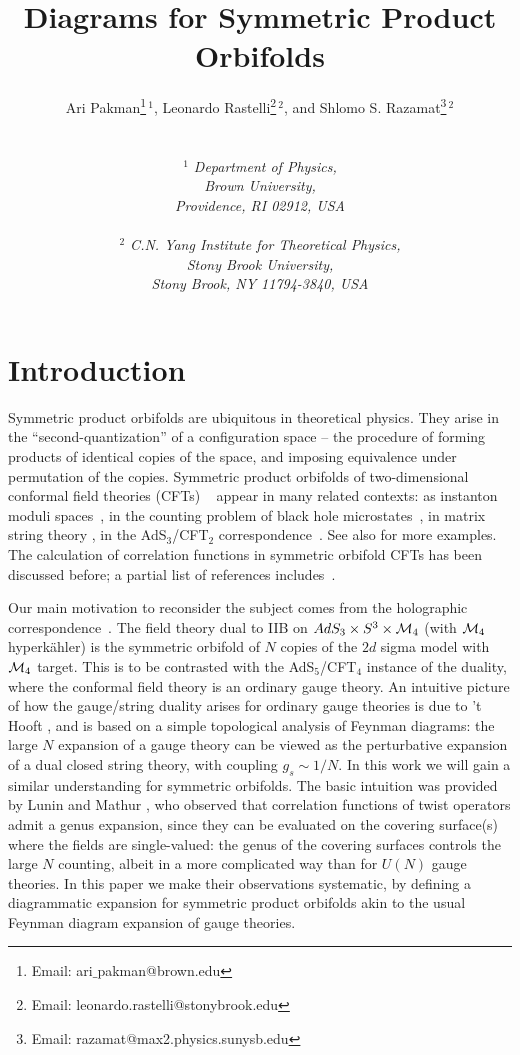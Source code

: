 \documentclass[letterpaper]{JHEP3}
\title{Diagrams for Symmetric Product Orbifolds}
\author{
Ari Pakman\footnote{Email: ari$\_$pakman@brown.edu}$^{~1}$, Leonardo Rastelli\footnote{Email: leonardo.rastelli@stonybrook.edu}$^{~2}$, and
Shlomo S. Razamat\footnote{Email: razamat@max2.physics.sunysb.edu}$^{~2}$
\\ \\ \\
\it $^1$ Department of Physics,\\ Brown University,\\
Providence, RI 02912, USA
\\
\\
\it $^2$ C.N. Yang Institute for Theoretical Physics,\\
\it Stony Brook University, \\
\it Stony Brook, NY 11794-3840, USA}
\begin{document}


\section{Introduction}

Symmetric product orbifolds
are ubiquitous  in theoretical physics. They arise in the  ``second-quantization'' of a configuration space --
the procedure of forming  products of identical copies of the space, and
imposing equivalence under permutation of the copies.
Symmetric product orbifolds of two-dimensional conformal field theories (CFTs) ~\cite{Klemm:1990df}
appear in  many related contexts:
as instanton moduli spaces~\cite{Vafa:1994tf}, in the counting problem
of  black hole microstates~\cite{Strominger:1996sh}, in matrix string theory \cite{Dijkgraaf:1996xw,Motl:1997th,Dijkgraaf:1997vv,Dijkgraaf:1998zd, Cove:2007kz},  in the AdS$_3$/CFT$_2$ correspondence~\cite{Maldacena:1997re,deBoer:1998ip,Dijkgraaf:1998gf,Seiberg:1999xz,
Larsen:1999uk,Lunin:2002fw,Gomis:2002qi,Gava:2002xb,
Gaberdiel:2007vu, Dabholkar:2007ey, Pakman:2007hn, Taylor:2007hs,
David:2008yk}. %
See also \cite{Dijkgraaf:1999za,Bantay:1999us,Halpern:2007vj,Recknagel:2002qq} for more examples.
The calculation of correlation functions in symmetric orbifold CFTs has been discussed before;
a partial list of references includes~\cite{Arutyunov:1997gt,Arutyunov:1997gi, Jevicki:1998bm, Lunin:2000yv,Lunin:2001pw}.

Our main motivation to reconsider the subject
comes from  the holographic
correspondence~\cite{Maldacena:1997re}.
 The field theory dual to IIB on $AdS_3 \times S^3 \times {\cal M}_4$  (with $ {\cal M}_4$ hyperk\"ahler)
is the symmetric orbifold of $N$ copies of the  $2d$ sigma model with ${\cal M}_4$ target.
This  is to be contrasted with the AdS$_5$/CFT$_4$ instance
of the duality, where the conformal field theory is an ordinary gauge theory. An intuitive picture of how the gauge/string duality arises 
for ordinary gauge theories is due to 't Hooft \cite{'tHooft:1973jz}, and is based on a simple topological
analysis of Feynman diagrams:  the large $N$ expansion
of a gauge theory can be viewed as the perturbative expansion of a dual closed string theory, with coupling $g_s \sim 1/N$.
In this work we will  
gain a similar understanding for
symmetric orbifolds. The basic intuition was provided by Lunin and Mathur \cite{Lunin:2000yv,Lunin:2001pw}, who observed
that correlation functions of twist operators admit a genus expansion, since they can be evaluated on the covering surface(s) where the fields are single-valued: 
the genus of the covering surfaces
controls the large $N$ counting, albeit in a more complicated way than for $U(N)$ gauge theories.
In this  paper we  make their observations systematic, 
by defining a diagrammatic expansion for symmetric product orbifolds akin to the usual Feynman diagram expansion of gauge theories.
\end{document}
